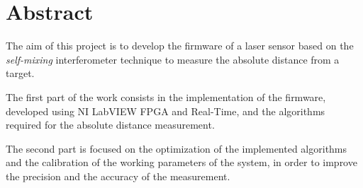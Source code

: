 \newpage
\chapter*{Abstract}

The aim of this project is to develop the firmware of a laser sensor based on the \textit{self-mixing} interferometer technique to measure the absolute distance from a target.

The first part of the work consists in the implementation of the firmware, developed using NI LabVIEW FPGA and Real-Time, and the algorithms required for the absolute distance measurement.

The second part is focused on the optimization of the implemented algorithms and the calibration of the working parameters of the system, in order to improve the precision and the accuracy of the measurement.